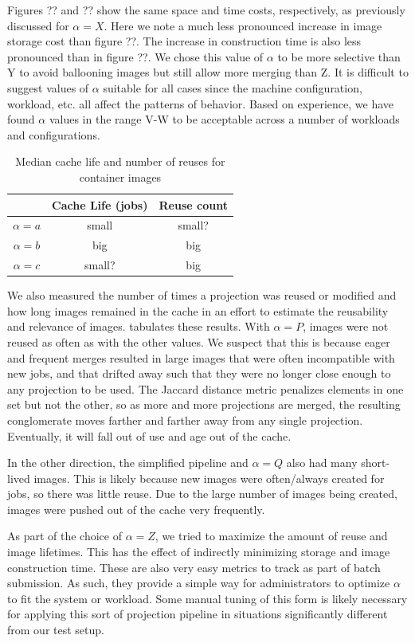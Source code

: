 \documentclass[conference]{IEEEtran}
\begin{document}
Figures ?? and ?? show the same space and time costs, respectively,
as previously discussed for $\alpha = X$.
Here we note a much less pronounced increase in image storage cost than figure ??.
The increase in construction time is also less pronounced than in figure ??.
We chose this value of $\alpha$ to be more selective than Y to avoid ballooning images but still allow more merging than Z.
It is difficult to suggest values of $\alpha$ suitable for all cases since the machine configuration, workload, etc. all affect the patterns of behavior.
Based on experience,
we have found $\alpha$ values in the range V-W to be acceptable across a number of workloads and configurations.

\begin{table}
\centering
\begin{tabular}{c|c c}
& Cache Life (jobs) & Reuse count \\ \hline
$\alpha=a$ & small & small? \\
$\alpha=b$ & big & big \\
$\alpha=c$ & small? & big \\
\end{tabular}
\caption{Median cache life and number of reuses for container images}
\label{tab:cachelife}
\end{table}

We also measured the number of times a projection was reused or modified and how long images remained in the cache in an effort to estimate the reusability and relevance of images.
 tabulates these results.
With $\alpha = P$,
images were not reused as often as with the other values.
We suspect that this is because eager and frequent merges resulted in large images that were often incompatible with new jobs,
and that drifted away such that they were no longer close enough to any projection to be used.
The Jaccard distance metric penalizes elements in one set but not the other,
so as more and more projections are merged,
the resulting conglomerate moves farther and farther away from any single projection.
Eventually, it will fall out of use and age out of the cache.

In the other direction,
the simplified pipeline and $\alpha = Q$ also had many short-lived images.
This is likely because new images were often/always created for jobs,
so there was little reuse.
Due to the large number of images being created,
images were pushed out of the cache very frequently.

As part of the choice of $\alpha = Z$,
we tried to maximize the amount of reuse and image lifetimes.
This has the effect of indirectly minimizing storage and image construction time.
These are also very easy metrics to track as part of batch submission.
As such, they provide a simple way for administrators to optimize $\alpha$ to fit the system or workload.
Some manual tuning of this form is likely necessary for applying this sort of projection pipeline in situations significantly different from our test setup.
\end{document}

